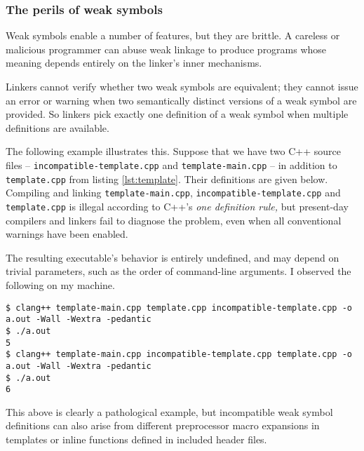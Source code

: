 \documentclass[12pt,a4paper]{article}
\newcommand{\Cpp}{C++}
\newcommand{\filename}[1]{\texttt{#1}}
\begin{document}
\subsubsection{The perils of weak symbols}

Weak symbols enable a number of features, but they are brittle. A careless or malicious programmer can abuse weak linkage to produce programs whose meaning depends entirely on the linker's inner mechanisms.

Linkers cannot verify whether two weak symbols are equivalent; they cannot issue an error or warning when two semantically distinct versions of a weak symbol are provided. So linkers pick exactly one definition of a weak symbol when multiple definitions are available.  

The following example illustrates this. Suppose that we have two \Cpp{} source files -- \filename{incompatible-template.cpp} and \filename{template-main.cpp} -- in addition to \filename{template.cpp} from listing \ref{lst:template}. Their definitions are given below.\\





Compiling and linking \filename{template-main.cpp}, \filename{incompatible-template.cpp} and \filename{template.cpp} is illegal according to \Cpp{}'s \emph{one definition rule,} but present-day compilers and linkers fail to diagnose the problem, even when all conventional warnings have been enabled. 

The resulting executable's behavior is entirely undefined, and may depend on trivial parameters, such as the order of command-line arguments. I observed the following on my machine.\\

\begin{lstlisting}[caption=undefined behavior due to weak linkage]
$ clang++ template-main.cpp template.cpp incompatible-template.cpp -o a.out -Wall -Wextra -pedantic
$ ./a.out
5
$ clang++ template-main.cpp incompatible-template.cpp template.cpp -o a.out -Wall -Wextra -pedantic
$ ./a.out
6
\end{lstlisting}

This above is clearly a pathological example, but incompatible weak symbol definitions can also arise from different preprocessor macro expansions in templates or inline functions defined in included header files. 
\end{document}
